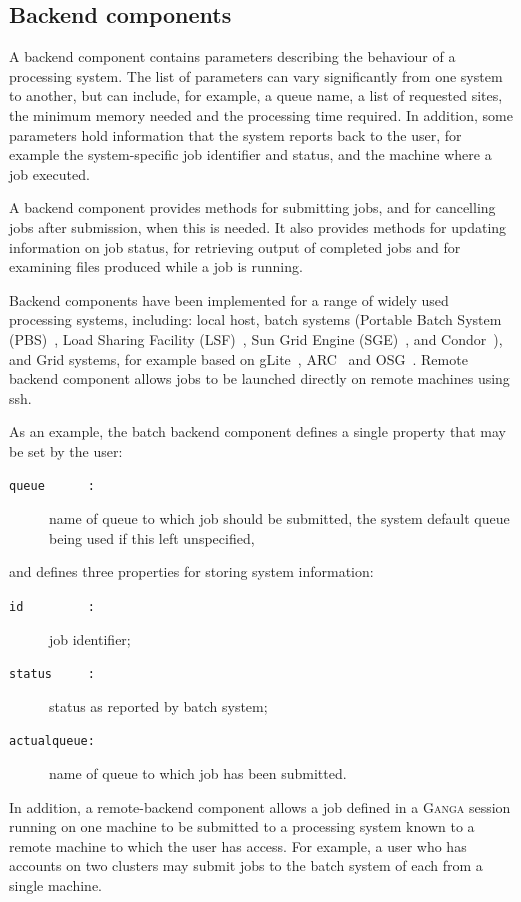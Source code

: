 \documentclass{elsart}
\def\ganga {\textsc{Ganga}\xspace}
\def\grid {Grid\xspace}
\newcommand{\code}[1]{\texttt{#1}}
\begin{document}
\begin{linenumbers}
\subsection{Backend components}
A backend component contains parameters describing the
behaviour of a processing system. The list of
parameters can vary significantly from one system to another, but can include,
for example, a queue name, a list of requested sites, the minimum memory
needed and the processing time required. In addition, some parameters hold
information that the system reports back to the user, for example the 
system-specific job identifier and status, and the machine where a
job executed.

A backend component provides methods for submitting jobs, and for cancelling
jobs after submission, when this is needed.  It also provides methods for
updating information on job status, for retrieving output of completed jobs
and for examining files produced while a job is running.

Backend components have been implemented for a range of widely used
processing systems, including: local host, batch systems
(Portable Batch System (PBS)~\cite{henderson_1995},
Load Sharing Facility (LSF)~\cite{schwickerath_2008},
Sun Grid Engine (SGE)~\cite{gentzsch_2001},
and Condor~\cite{thain_2005}), and \grid systems, for example  based on
gLite~\cite{andreetto_2008}, ARC~\cite{ellert_2007} and OSG~\cite{OSG}.
Remote backend component allows jobs to be launched directly on remote machines 
using ssh.  

As an example, the batch backend component defines a
single property that may be set by the user:
\begin{description}
\item[\code{queue~~~~~~:}] name of queue to which job should be submitted, the system default
queue being used if this left unspecified,
\end{description}
and defines three properties for storing system information:
\begin{description}
\item[\code{id~~~~~~~~~:}] job identifier;
\item[\code{status~~~~~:}] status as reported by batch system;
\item[\code{actualqueue:}] name of queue to which job has been submitted.
\end{description}

In addition, a remote-backend component allows a job defined in a \ganga
session running on one machine to be submitted to a processing system
known to a remote machine to which the user has access.  For example,
a user who has accounts on two clusters may submit jobs to the batch system
of each from a single machine.


\end{linenumbers}
\end{document}
